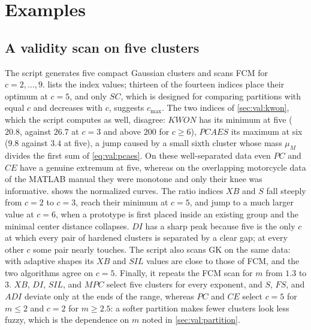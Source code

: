 \section{Examples}\label{sec:val:examples}

\subsection{A validity scan on five clusters}\label{sec:val:ex:scan}

The script  generates five compact Gaussian clusters and scans FCM for $c=2,\dots,9$.  lists the index values; thirteen of the fourteen indices place their optimum at $c=5$, and only $SC$, which is designed for comparing partitions with equal $c$ and decreases with $c$, suggests $c_{\max}$. The two indices of \cref{sec:val:kwon}, which the script computes as well, disagree: $KWON$ has its minimum at five ($20.8$, against $26.7$ at $c=3$ and above $200$ for $c\ge6$), $PCAES$ its maximum at six ($9.8$ against $3.4$ at five), a jump caused by a small sixth cluster whose mass $\mu_M$ divides the first sum of \eqref{eq:val:pcaes}. On these well-separated data even $PC$ and $CE$ have a genuine extremum at five, whereas on the overlapping motorcycle data of the MATLAB manual they were monotone and only their knee was informative.  shows the normalized curves. The ratio indices $XB$ and $S$ fall steeply from $c=2$ to $c=3$, reach their minimum at $c=5$, and jump to a much larger value at $c=6$, when a prototype is first placed inside an existing group and the minimal center distance collapses. $DI$ has a sharp peak because five is the only $c$ at which every pair of hardened clusters is separated by a clear gap; at every other $c$ some pair nearly touches. The script also scans GK on the same data: with adaptive shapes its $XB$ and $SIL$ values are close to those of FCM, and the two algorithms agree on $c=5$. Finally, it repeats the FCM scan for $m$ from $1.3$ to $3$. $XB$, $DI$, $SIL$, and $MPC$ select five clusters for every exponent, and $S$, $FS$, and $ADI$ deviate only at the ends of the range, whereas $PC$ and $CE$ select $c=5$ for $m\le2$ and $c=2$ for $m\ge2.5$: a softer partition makes fewer clusters look less fuzzy, which is the dependence on $m$ noted in \cref{sec:val:partition}.

